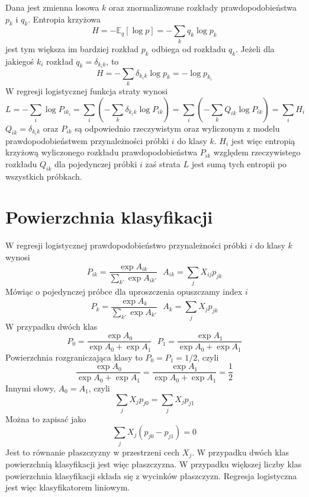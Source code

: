 \documentclass[10pt,a4paper]{article}
\newcommand{\E}{\mathbb{E}}
\begin{document}
Dana jest zmienna losowa $k$ oraz znormalizowane rozkłady prawdopodobieństwa $p_k$ i $q_k$. Entropia krzyżowa
\begin{displaymath}
H=-\E_q[\log p]=-\sum_kq_k\log p_k
\end{displaymath}
jest tym większa im bardziej rozkład $p_k$ odbiega od rozkładu $q_k$. Jeżeli dla jakiegoś $k_i$ rozkład $q_k=\delta_{k_ik}$, to
\begin{displaymath}
H=-\sum_k\delta_{k_ik}\log p_k=-\log p_{k_i}
\end{displaymath}
W regresji logistycznej funkcja straty wynosi
\begin{displaymath}
L=-\sum_i\log P_{ik_i}=\sum_i\left(-\sum_k\delta_{k_ik}\log P_{ik}\right)=\sum_i\left(-\sum_kQ_{ik}\log P_{ik}\right)=\sum_iH_i
\end{displaymath}
$Q_{ik}=\delta_{k_ik}$ oraz $P_{ik}$ są odpowiednio rzeczywistym oraz wyliczonym z modelu prawdopodobieństwem przynależności próbki $i$ do klasy $k$. $H_i$ jest więc entropią krzyżową wyliczonego rozkładu prawdopodobieństwa $P_{ik}$ względem rzeczywistego rozkładu $Q_{ik}$ dla pojedynczej próbki $i$ zaś strata $L$ jest sumą tych entropii po wszystkich próbkach.

\section{Powierzchnia klasyfikacji}

W regresji logistycznej prawdopodobieństwo przynależności próbki $i$ do klasy $k$ wynosi
\begin{displaymath}
P_{ik}=\frac{\exp A_{ik}}{\sum_{k'}\exp A_{ik'}} ~~~ A_{ik}=\sum_jX_{ij}p_{jk}
\end{displaymath}
Mówiąc o pojedynczej próbce dla uproszczenia opuszczamy index $i$
\begin{displaymath}
P_k=\frac{\exp A_k}{\sum_{k'}\exp A_{k'}} ~~~ A_k=\sum_jX_jp_{jk}
\end{displaymath}
W przypadku dwóch klas
\begin{displaymath}
P_0=\frac{\exp A_0}{\exp A_0+\exp A_1} ~~~ P_1=\frac{\exp A_1}{\exp A_0+\exp A_1}
\end{displaymath}
Powierzchnia rozgraniczająca klasy to $P_0=P_1=1/2$, czyli
\begin{displaymath}
\frac{\exp A_0}{\exp A_0+\exp A_1}=\frac{\exp A_1}{\exp A_0+\exp A_1}=\frac{1}{2}
\end{displaymath}
Innymi słowy, $A_0=A_1$, czyli
\begin{displaymath}
\sum_jX_jp_{j0}=\sum_jX_jp_{j1}
\end{displaymath}
Można to zapisać jako
\begin{displaymath}
\sum_jX_j(p_{j0}-p_{j1})=0
\end{displaymath}
Jest to równanie płaszczyzny w przestrzeni cech $X_j$. W przypadku dwóch klas powierzchnią klasyfikacji jest więc płaszczyzna. W przypadku większej liczby klas powierzchnia klasyfikacji składa się z wycinków płaszczyzn. Regresja logistyczna jest więc klasyfikatorem liniowym.
\end{document}
